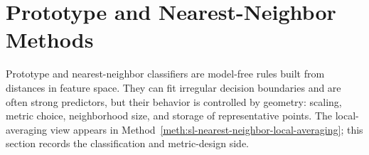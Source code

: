 \section{Prototype and Nearest-Neighbor Methods}

Prototype and nearest-neighbor classifiers are model-free rules built from distances in feature space.  They can fit irregular decision boundaries and are often strong predictors, but their behavior is controlled by geometry: scaling, metric choice, neighborhood size, and storage of representative points.  The local-averaging view appears in Method~\ref{meth:sl-nearest-neighbor-local-averaging}; this section records the classification and metric-design side.




